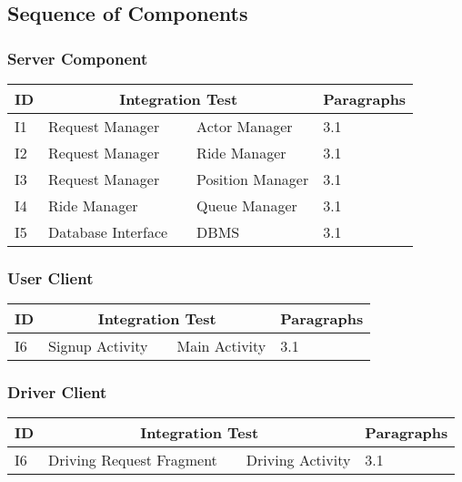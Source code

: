 \subsection{Sequence of Components} %
\label{sub:sequence_of_components}

\subsubsection{Server Component} %
\label{ssub:server_component}

\begin{tabularx} {\textwidth} { l|l c l|l }
	\textbf{ID} & \multicolumn {3}{|c|}{\textbf{Integration Test}} & \textbf{Paragraphs} \\ \hline
	I1 & Request Manager & \textrightarrow & Actor Manager & 3.1 \\ \hline
	I2 & Request Manager & \textrightarrow & Ride Manager & 3.1 \\ \hline
	I3 & Request Manager & \textrightarrow & Position Manager & 3.1 \\ \hline
	I4 & Ride Manager & \textrightarrow & Queue Manager & 3.1 \\ \hline
	I5 & Database Interface & \textrightarrow & DBMS & 3.1 \\ \hline
\end{tabularx}

\subsubsection{User Client} %
\label{ssub:user_client}

\begin{tabularx} {\textwidth} { l|l c l|l }
	\textbf{ID} & \multicolumn {3}{|c|}{\textbf{Integration Test}} & \textbf{Paragraphs} \\ \hline
	I6 & Signup Activity & \textrightarrow & Main Activity & 3.1 \\ \hline
\end{tabularx}

\subsubsection{Driver Client} %
\label{ssub:driver_client}

\begin{tabularx} {\textwidth} { l|l c l|l }
	\textbf{ID} & \multicolumn {3}{|c|}{\textbf{Integration Test}} & \textbf{Paragraphs} \\ \hline
	I6 & Driving Request Fragment & \textrightarrow & Driving Activity & 3.1 \\ \hline
\end{tabularx}


